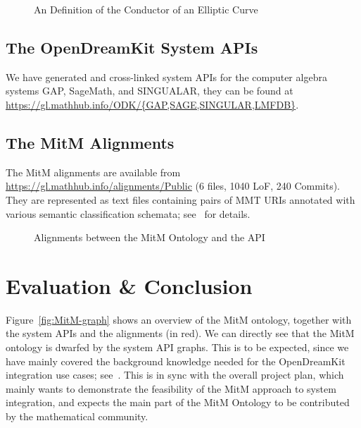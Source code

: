 \documentclass{deliverablereport}
\begin{document}

\begin{figure}[ht]\centering
  \caption{An \sTeX Definition of the Conductor of an Elliptic
    Curve}\label{fig:conductor}
\end{figure}

\subsection{The OpenDreamKit System APIs}\label{sec:sysapis}

We have generated and cross-linked system APIs for the computer algebra systems GAP,
SageMath, and SINGUALAR, they can be found at
\url{https://gl.mathhub.info/ODK/{GAP,SAGE,SINGULAR,LMFDB}}.

\subsection{The MitM Alignments}

The MitM alignments are available from \url{https://gl.mathhub.info/alignments/Public} (6
files, 1040 LoF, 240 Commits). They are represented as text files containing pairs of MMT
URIs annotated with various semantic classification schemata;
see~\cite{MueGauKal:cacfms17} for details.
\begin{figure}[ht]\centering
  \caption{Alignments between the MitM Ontology and the \GAP API}\label{fig:cgtontology}
\end{figure}

\section{Evaluation \& Conclusion}\label{sec:concl}

Figure~\ref{fig:MitM-graph} shows an overview of the MitM ontology, together with the
system APIs and the alignments (in red). We can directly see that the MitM ontology is
dwarfed by the system API graphs. This is to be expected, since we have mainly covered the
background knowledge needed for the OpenDreamKit integration use cases;
see~\cite{ODK-D6.5}. This is in sync with the overall project plan, which mainly wants to
demonstrate the feasibility of the MitM approach to system integration, and expects the
main part of the MitM Ontology to be contributed by the mathematical community.
\end{document}
